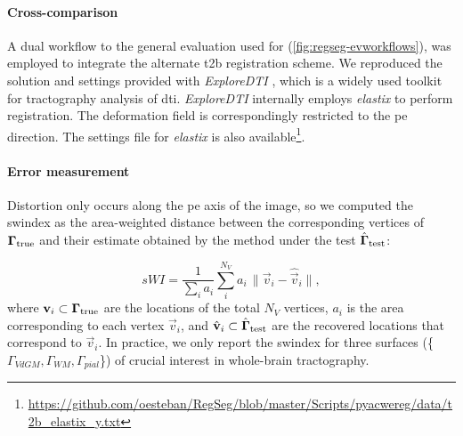 \paragraph*{Cross-comparison} %
A dual workflow to the general evaluation used for \regseg{} (\autoref{fig:regseg-evworkflows}),
  was employed to integrate the alternate \gls*{t2b} registration scheme.
We reproduced the solution and settings provided with \emph{ExploreDTI}
  \citep{leemans_exploredti_2009}, which is a widely used toolkit for tractography analysis of
  \gls*{dti}.
\emph{ExploreDTI} internally employs \emph{elastix} \citep{klein_elastix_2010} to
  perform registration.
The deformation field is correspondingly restricted to the \gls*{pe} direction.
The settings file for \emph{elastix} is also
  available\footnote{\url{https://github.com/oesteban/RegSeg/blob/master/Scripts/pyacwereg/data/t2b_elastix_y.txt}}.


\paragraph*{Error measurement}\label{sec:regseg-experiments_evaluation}
Distortion only occurs along the \gls*{pe} axis of the image, so we computed the
  \gls*{swindex} as the area-weighted distance between the corresponding vertices of
  $\boldsymbol{\Gamma}_\text{true}$ and their estimate obtained by the method under the test $\hat{\boldsymbol{\Gamma}}_\text{test}$:

  \begin{equation}
  sWI = \frac{1}{\sum_i a_i} \sum\limits_i^{N_V} a_i\,\|
  \vec{v}_i - \hat{\vec{v}}_i \|,
  \label{eq:regseg-swindex}
  \end{equation}
  where $\mathbf{v}_i \subset \boldsymbol{\Gamma}_\text{true}$ are the locations of the total $N_V$ vertices,
  $a_i$ is the area corresponding to each vertex $\vec{v}_i$,
  and $\hat{\mathbf{v}}_i \subset \hat{\boldsymbol{\Gamma}}_\text{test}$ are the recovered locations
  that correspond to $\vec{v}_i$.
In practice, we only report the \gls*{swindex} for three surfaces (\{$\Gamma_{VdGM}, \Gamma_{WM}, \Gamma_{pial}$\})
  of crucial interest in whole-brain tractography.
